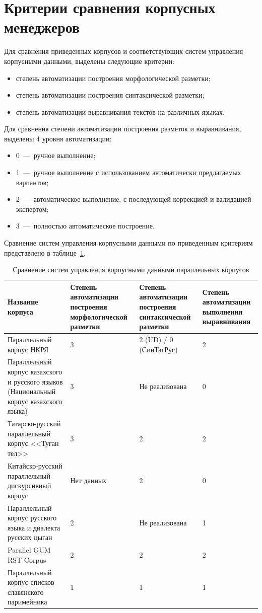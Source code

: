 \section{Критерии сравнения корпусных менеджеров}

Для сравнения приведенных корпусов и соответствующих систем управления корпусными данными, выделены следующие критерии:
\begin{itemize}
	\item степень автоматизации построения морфологической разметки;
	\item степень автоматизации построения синтаксической разметки;
	\item степень автоматизации выравнивания текстов на различных языках.
\end{itemize}
Для сравнения степени автоматизации построения разметок и выравнивания, выделены 4 уровня автоматизации:
\begin{itemize}
	\item 0~---~ручное выполнение;
	\item 1~---~ручное выполнение с использованием автоматически предлагаемых вариантов;
	\item 2~---~автоматическое выполнение, с последующей коррекцией и валидацией экспертом;
	\item 3~---~полностью автоматическое построение.
\end{itemize}
Сравнение систем управления корпусными данными по приведенным критериям представлено в таблице~\ref{tab:compare_cdsm}.

\begin{table}[H]
	\centering
	\caption{Сравнение систем управления корпусными данными параллельных корпусов}
	\begin{tabular}{|p{4cm}|p{}|p{}|p{}|}
		\hline
		Название корпуса & Степень автоматизации построения морфологической разметки & Степень автоматизации построения синтаксической разметки & Степень автоматизации выполнения выравнивания\\\hline
		Параллельный корпус НКРЯ & 3 & 2 (UD) / \nohyphens{0 (СинТагРус)} & 2 \\\hline
		Параллельный корпус казахского и русского языков (Национальный корпус казахского языка) & 3 & Не реализована &  0 \\\hline
		Татарско-русский параллельный корпус <<Туган тел>>& 3 & 2 & 2 \\\hline
		Китайско-русский параллельный дискурсивный корпус & Нет данных & 2 & 0 \\\hline
		Параллельный корпус русского языка и диалекта русских цыган & 2 & Не реализована & 1 \\\hline
		Parallel GUM RST Corpus & 2 & 2 & 2 \\\hline
		Параллельный корпус списков славянского паримейника & 1 & 1 & 1 \\\hline
	\end{tabular}
	\label{tab:compare_cdsm}
\end{table}

